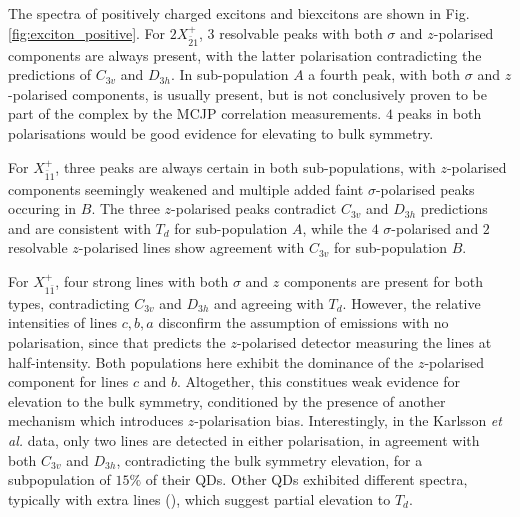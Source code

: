 The spectra of positively charged excitons and biexcitons are shown in Fig. \ref{fig:exciton_positive}. For $2X^+_{\bar{2}1}$, 3 resolvable peaks with both $\sigma$ and $z$-polarised components are always present, with the latter polarisation contradicting the predictions of $C_{3v}$ and $D_{3h}$. In sub-population $A$ a fourth peak, with both $\sigma$ and $z$-polarised components, is usually present, but is not conclusively proven to be part of the complex by the MCJP correlation measurements. $4$ peaks in both polarisations would be good evidence for elevating to bulk symmetry.

For $X^+_{\bar{1}1}$, three peaks are always certain in both sub-populations, with $z$-polarised components seemingly weakened and multiple added faint $\sigma$-polarised peaks occuring in $B$. The three $z$-polarised peaks contradict $C_{3v}$ and $D_{3h}$ predictions and are consistent with $T_d$ for sub-population $A$, while the $4$ $\sigma$-polarised and $2$ resolvable $z$-polarised lines show agreement with $C_{3v}$ for sub-population $B$.

For $X^+_{1\bar{1}}$, four strong lines with both $\sigma$ and $z$ components are present for both types, contradicting $C_{3v}$ and $D_{3h}$ and agreeing with $T_d$. However, the relative intensities of lines $c,b,a$ disconfirm the assumption of emissions with no polarisation, since that predicts the $z$-polarised detector measuring the lines at half-intensity. Both populations here exhibit the dominance of the $z$-polarised component for lines $c$ and $b$. Altogether, this constitues weak evidence for elevation to the bulk symmetry, conditioned by the presence of another mechanism which introduces $z$-polarisation bias. Interestingly, in the Karlsson \textit{et al.} data, only two lines are detected in either polarisation, in agreement with both $C_{3v}$ and $D_{3h}$, contradicting the bulk symmetry elevation, for a subpopulation of $15\%$ of their QDs. Other QDs exhibited different spectra, typically with extra lines (\cite[Fig. 19]{karlsson}), which suggest partial elevation to $T_d$.
\\


